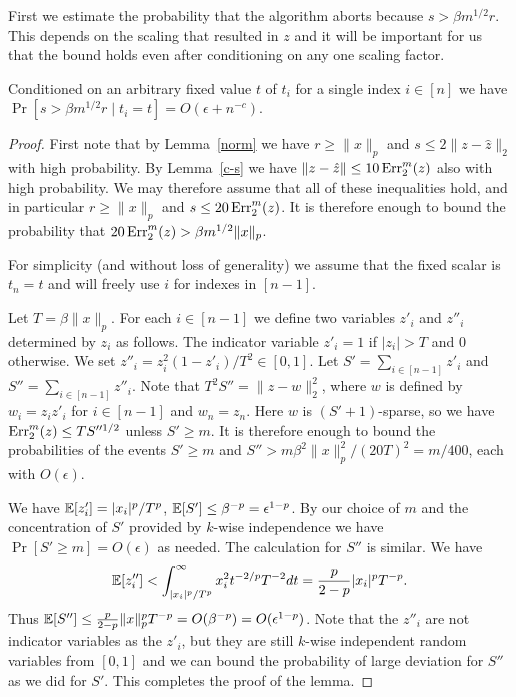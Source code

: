 First we estimate the probability that the algorithm aborts because $s>\beta
m^{1/2}r$. This depends on the scaling that resulted in $z$ and it will be important
for us that the bound holds even after conditioning on any one scaling factor.

\begin{lemma}\label{abort}
Conditioned on an arbitrary fixed value $t$ of $t_i$ for a single index
$i\in[n]$ we have $\Pr[s>\beta m^{1/2}r\mid t_i=t]=O(\epsilon+n^{-c})$.
\end{lemma}

\begin{proof}
First note that by Lemma~\ref{norm} we have $r\ge\|x\|_p$ and
$s\le2\|z-\hat z\|_2$ with high probability. By
Lemma~\ref{c-s} we have $\|z-\hat z\|\le10\operatorname{Err}_2^m(z)$ also
with high probability. We may therefore assume that all of these inequalities
hold, and in particular
$r\ge\|x\|_p$ and $s\le20\operatorname{Err}_2^m(z)$. It is therefore enough to bound the
probability that $20\operatorname{Err}_2^m(z)>\beta m^{1/2}\|x\|_p$.

For simplicity (and without loss of generality) we assume that the fixed
scalar is $t_n=t$ and will freely use $i$ for indexes in $[n-1]$.

Let $T=\beta\|x\|_p$. For each $i\in[n-1]$ we define
two variables $z'_i$ and $z''_i$ determined by $z_i$ as follows. The indicator
variable $z'_i=1$ if $|z_i|>T$ and $0$ otherwise. We set
$z''_i=z_i^2(1-z'_i)/T^2\in[0,1]$. Let $S'=\sum_{i\in[n-1]}z'_i$ and
$S''=\sum_{i\in[n-1]}z''_i$. Note that $T^2S''=\|z-w\|_2^2$, where $w$ is
defined by $w_i=z_iz'_i$ for $i\in[n-1]$ and $w_n=z_n$. Here $w$ is
$(S'+1)$-sparse, so we have $\operatorname{Err}_2^m(z)\le TS''^{1/2}$ unless $S'\ge m$.
It is therefore enough to bound the probabilities of the events
$S'\ge m$ and $S''>m\beta^2\|x\|_p^2/(20T)^2=m/400$, each with  $O(\epsilon)$.

We have $\operatorname*{\mathbb{E}}[z'_i]=|x_i|^p/T^p$, $\operatorname*{\mathbb{E}}[S']\le\beta^{-p}=\epsilon^{1-p}$. By our
choice of $m$ and the concentration of $S'$ provided by $k$-wise independence
we have $\Pr[S'\ge m]=O(\epsilon)$ as needed.
The calculation for $S''$ is similar. We have
$$\operatorname*{\mathbb{E}}[z''_i]<\int_{|x_i|^p/T^p}^\infty x_i^2t^{-2/p}T^{-2}dt=\frac
p{2-p}|x_i|^pT^{-p}.$$ Thus $\operatorname*{\mathbb{E}}[S'']\le\frac
p{2-p}\|x\|_p^pT^{-p}=O(\beta^{-p})=O(\epsilon^{1-p})$. Note that the $z''_i$
are not indicator variables as the $z'_i$, but they are still $k$-wise
independent random variables from $[0,1]$ and we can bound the probability of
large deviation for $S''$ as we did for $S'$. This completes the proof of the
lemma.
\end{proof}

